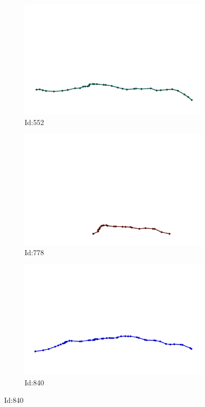 \documentclass[12pt,twoside]{report}
\begin{document}
\begin{figure}
\centering
\begin{subfigure}[b]{0.20\textwidth}
\centering
\includegraphics[width=\textwidth]{../../trajectories/552.png}
\caption{Id:552}
\end{subfigure}
\begin{subfigure}[b]{0.20\textwidth}
\centering
\includegraphics[width=\textwidth]{../../trajectories/778.png}
\caption{Id:778}
\end{subfigure}
\begin{subfigure}[b]{0.20\textwidth}
\centering
\includegraphics[width=\textwidth]{../../trajectories/840.png}
\caption{Id:840}
\end{subfigure}
\end{figure}
\end{document}
